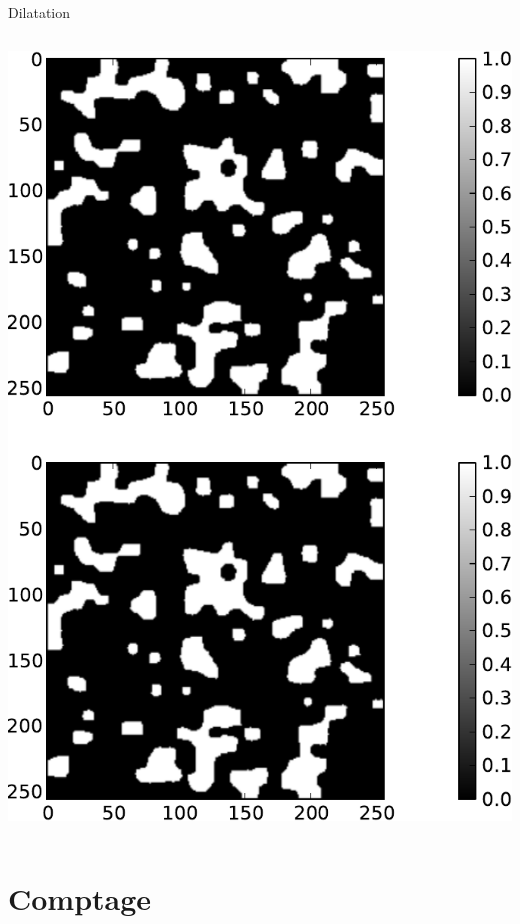 \documentclass[8pt,a4paper]{beamer}
\begin{document}
\begin{frame}[containsverbatim]{Dilatation}
  \begin{columns}
  \includegraphics[width=\textwidth]{figures/dilatation.pdf} 
  
    \end{columns}
\end{frame}  

\section{Comptage}
\end{document}
